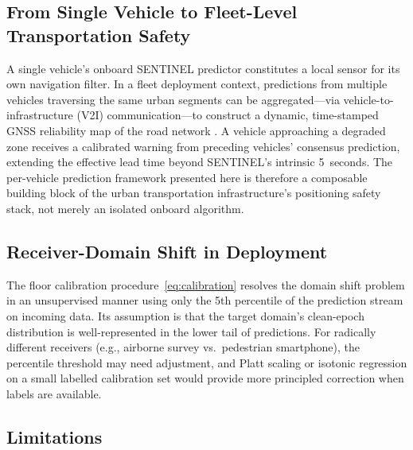 \documentclass[journal]{IEEEtran}
\begin{document}
\subsection{From Single Vehicle to Fleet-Level Transportation Safety}

A single vehicle's onboard SENTINEL predictor constitutes a local sensor for
its own navigation filter.  In a fleet deployment context, predictions from
multiple vehicles traversing the same urban segments can be aggregated---via
vehicle-to-infrastructure (V2I) communication---to construct a dynamic,
time-stamped GNSS reliability map of the road network
\cite{[AuthorYear_V2I_GNSS_map]}.  A vehicle approaching a degraded zone
receives a calibrated warning from preceding vehicles' consensus prediction,
extending the effective lead time beyond SENTINEL's intrinsic 5~seconds.  The
per-vehicle prediction framework presented here is therefore a composable
building block of the urban transportation infrastructure's positioning safety
stack, not merely an isolated onboard algorithm.

\subsection{Receiver-Domain Shift in Deployment}

The floor calibration procedure~\eqref{eq:calibration} resolves the
domain shift problem in an unsupervised manner using only the 5th percentile
of the prediction stream on incoming data.  Its assumption is that the
target domain's clean-epoch distribution is well-represented in the lower
tail of predictions.  For radically different receivers (e.g., airborne
survey vs.\ pedestrian smartphone), the percentile threshold may need
adjustment, and Platt scaling \cite{[AuthorYear_Platt_scaling]} or isotonic
regression on a small labelled calibration set would provide more principled
correction when labels are available.

\subsection{Limitations}
\end{document}
